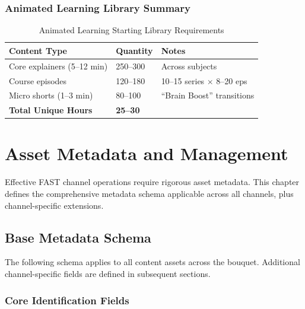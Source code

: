 \documentclass[12pt,letterpaper,twoside]{report}
\begin{document}
\subsection{Animated Learning Library Summary}

\begin{table}[H]
\centering
\caption{Animated Learning Starting Library Requirements}
\label{tab:learning-library}
\begin{tabular}{@{}L{6cm}R{3cm}L{5cm}@{}}
\toprule
\textbf{Content Type} & \textbf{Quantity} & \textbf{Notes} \\
\midrule
Core explainers (5--12 min) & 250--300 & Across subjects \\
Course episodes & 120--180 & 10--15 series $\times$ 8--20 eps \\
Micro shorts (1--3 min) & 80--100 & ``Brain Boost'' transitions \\
\midrule
\textbf{Total Unique Hours} & \textbf{25--30} & \\
\bottomrule
\end{tabular}
\end{table}

\chapter{Asset Metadata and Management}
\label{ch:metadata}

Effective FAST channel operations require rigorous asset metadata. This chapter defines the comprehensive metadata schema applicable across all channels, plus channel-specific extensions.

\section{Base Metadata Schema}

The following schema applies to all content assets across the bouquet. Additional channel-specific fields are defined in subsequent sections.

\subsection{Core Identification Fields}
\end{document}
